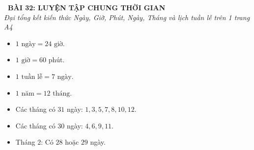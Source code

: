 \documentclass[11pt,a4paper]{article}
\begin{document}
\begin{tcolorbox}[
  enhanced,
  colback=violet!8!white,
  colframe=violet!70!black,
  arc=3mm, boxrule=1.2pt,
  left=3mm, right=3mm, top=2mm, bottom=2mm,
  halign=center
]
  {\LARGE\bfseries\color{violet!90!black}\faBookmark\ BÀI 32: LUYỆN TẬP CHUNG THỜI GIAN}\\[1mm]
  {\itshape\footnotesize\color{black!75} Đại tổng kết kiến thức Ngày, Giờ, Phút, Ngày, Tháng và lịch tuần lễ trên 1 trang A4}
\end{tcolorbox}

\vspace{-2mm}

\noindent
\begin{minipage}[t]{0.49\textwidth}\vspace{0pt}
\begin{tcolorbox}[
  enhanced,
  colback=violet!4!white,
  colframe=violet!75!black,
  arc=2mm, boxrule=0.8pt,
  left=2mm, right=2mm, top=1.8mm, bottom=1.8mm,
  title={\footnotesize\bfseries\color{white}\faKey\ 1. Bảng quy đổi thời gian}
]
{\footnotesize
\begin{itemize}\setlength{\itemsep}{1pt}\setlength{\leftskip}{-2.5mm}
  \item $1\text{ ngày} = 24\text{ giờ}$.
  \item $1\text{ giờ} = 60\text{ phút}$.
  \item $1\text{ tuần lễ} = 7\text{ ngày}$.
  \item $1\text{ năm} = 12\text{ tháng}$.
  \item Các tháng có $31$ ngày: $1, 3, 5, 7, 8, 10, 12$.
  \item Các tháng có $30$ ngày: $4, 6, 9, 11$.
  \item Tháng $2$: Có $28$ hoặc $29$ ngày.
\end{itemize}
}
\end{tcolorbox}
\end{minipage}
\hfill
\end{document}
